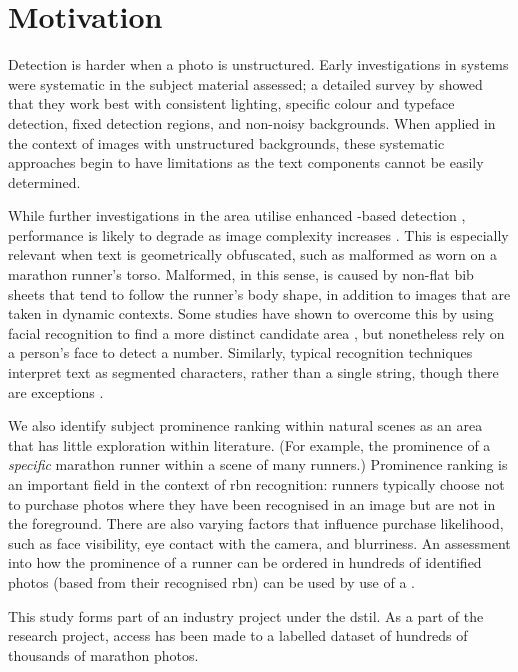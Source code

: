 \section{Motivation}
\label{sec:introduction:motivation}

Detection is harder when a photo is unstructured. Early investigations in  systems were systematic in the subject material assessed; a detailed survey by \citet{Anagnostopoulos:2008vu} showed that they work best  with consistent lighting, specific colour and typeface detection, fixed detection regions, and non-noisy backgrounds. When applied in the context of images with unstructured backgrounds, these systematic approaches begin to have limitations as the text components cannot be easily determined.

While further investigations in the area utilise enhanced -based detection \citep{Chen:2011ul,Shivakumara:2011dn,Epshtein:2010tj}, performance is likely to degrade as image complexity increases \citep{Li:2012wd}. This is especially relevant when text is geometrically obfuscated, such as malformed  as worn on a marathon runner's torso. Malformed, in this sense, is caused by non-flat bib sheets that tend to follow the runner's body shape, in addition to images that are taken in dynamic contexts. Some studies have shown to overcome this by using facial recognition to find a more distinct candidate area \citep{Benami:2012jf}, but nonetheless rely on a person's face to detect a number. Similarly, typical recognition techniques interpret text as segmented characters, rather than a single string, though there are exceptions \citep{Zhu:2016ut}.

We also identify subject prominence ranking within natural scenes as an area that has little exploration within literature. (For example, the prominence of a \textit{specific} marathon runner within a scene of many runners.) Prominence ranking is an important field in the context of \gls{rbn} recognition: runners typically choose not to purchase photos where they have been recognised in an image but are not in the foreground. There are also varying factors that influence purchase likelihood, such as face visibility, eye contact with the camera, and blurriness. An assessment into how the prominence of a runner can be ordered in hundreds of identified photos (based from their recognised \gls{rbn}) can be used by use of a .

This study forms part of an industry project under the \gls{dstil}. As a part of the research project, access has been made to a labelled dataset of hundreds of thousands of marathon photos.

